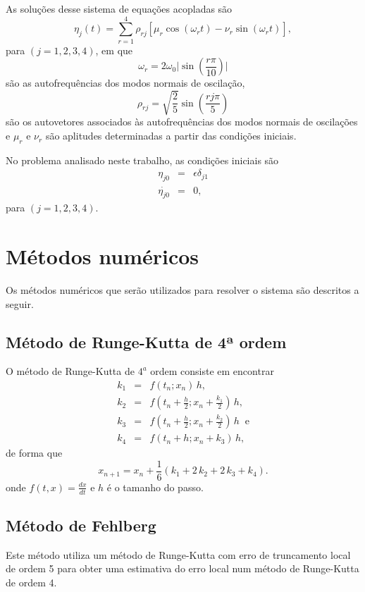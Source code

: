 \documentclass[brazilian, 12pt, a4paper, final]{article}
\begin{document}
\begin{multicols*}{2}
As soluções desse sistema de equações acopladas são
\begin{equation}
	\eta_j(t)=\sum_{r=1}^4\rho_{rj}[\mu_r \cos(\omega_r t)-\nu_r\sin(\omega_r t)],
\end{equation}
para $(j=1,2,3,4)$, em que
\begin{equation}
	\omega_r=2\omega_0\bigg\vert\sin\left(\frac{r\pi}{10}\right)\bigg\lvert
\end{equation}
são as autofrequências dos modos normais de oscilação,
\begin{equation}
	\rho_{rj}=\sqrt{\frac{2}{5}}\sin\left(\frac{rj\pi}{5}\right)
\end{equation}
são os autovetores associados às autofrequências dos modos normais de oscilações e $\mu_r$ e $\nu_r$ são aplitudes determinadas a partir das condições iniciais.

No problema analisado neste trabalho, as condições iniciais são
\begin{eqnarray}
	\eta_{j0}&=&\epsilon\delta_{j1} \\
	\dot{\eta_{j0}}&=&0,
\end{eqnarray}
para $(j=1,2,3,4)$.

\section{Métodos numéricos}

Os métodos numéricos que serão utilizados para resolver o sistema são descritos a seguir.

\subsection{Método de Runge-Kutta de 4ª ordem}
O método de Runge-Kutta de $4^{a}$ ordem consiste em encontrar
\begin{eqnarray}
 k_1&=&f(t_n;x_n)\,h, \\
 k_2&=&f\left(t_n+\frac{h}{2}; x_n +\frac{k_1}{2}\right)\,h, \\
 k_3&=&f\left(t_n+\frac{h}{2}; x_n +\frac{k_2}{2}\right)\,h \;\;\mathrm{ e} \\
 k_4&=&f\left(t_n+h; x_n + k_3\right)\,h,
\end{eqnarray}
\noindent
de forma que
\begin{equation}
 x_{n+1}=x_{n}+\frac{1}{6}\left(k_1+2\,k_2+2\,k_3+k_4\right). 
\end{equation}
\noindent
onde $f(t,x)=\frac{dx}{dt}$ e $h$ é o tamanho do passo.

\subsection{Método de Fehlberg}
Este método utiliza um método de Runge-Kutta com erro de truncamento local de ordem 5 para obter uma estimativa do erro local num método de Runge-Kutta de ordem 4.


\end{multicols*}
\end{document}
